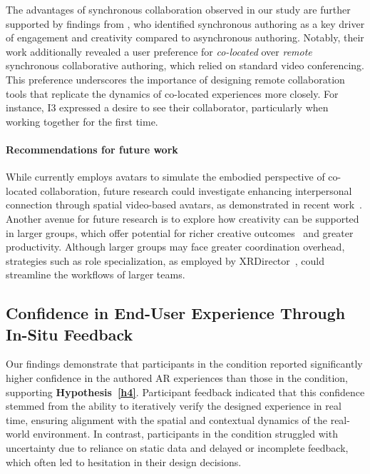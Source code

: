 The advantages of synchronous collaboration observed in our study are further supported by findings from \citet{guoBlocksCollaborativePersistent2019}, who identified synchronous authoring as a key driver of engagement and creativity compared to asynchronous authoring. Notably, their work additionally revealed a user preference for \textit{co-located} over \textit{remote} synchronous collaborative authoring, which relied on standard video conferencing. This preference underscores the importance of designing remote collaboration tools that replicate the dynamics of co-located experiences more closely. For instance, I3 expressed a desire to see their collaborator, particularly when working together for the first time.

\paragraph{\textbf{Recommendations for future work}}
While \SystemName currently employs avatars to simulate the embodied perspective of co-located collaboration, future research could investigate enhancing interpersonal connection through spatial video-based avatars, as demonstrated in recent work~\cite{vanukuruDualStreamSpatiallySharing2023,qianChatDirectorEnhancingVideo2024}. Another avenue for future research is to explore how creativity can be supported in larger groups, which offer potential for richer creative outcomes~\cite{paulusGroupCreativityInnovation2003} and greater productivity. Although larger groups may face greater coordination overhead, strategies such as role specialization, as employed by XRDirector~\cite{nebelingXRDirectorRoleBasedCollaborative2020}, could streamline the workflows of larger teams.

\subsection{Confidence in End-User Experience Through In-Situ Feedback}
Our findings demonstrate that participants in the \sync condition reported significantly higher confidence in the authored AR experiences than those in the \async condition, supporting \textbf{Hypothesis~\ref{h4}}. Participant feedback indicated that this confidence stemmed from the ability to iteratively verify the designed experience in real time, ensuring alignment with the spatial and contextual dynamics of the real-world environment. In contrast, participants in the \async condition struggled with uncertainty due to reliance on static data and delayed or incomplete feedback, which often led to hesitation in their design decisions.

